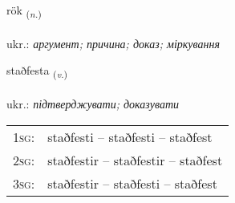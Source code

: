 \documentclass[frontgrid, backgrid]{flacards}\usepackage[]{graphicx}\usepackage[]{xcolor}
\begin{document}
\renewcommand{\flhead}{\vskip5pt \fboxsep=0pt {\small\bfseries\footnotesize Nafnorð | іменник}}
\renewcommand{\fcfoot}{\vskip5pt \fboxsep=0pt \hspace{2pt}{\small\bfseries\footnotesize 1K}}

\renewcommand{\blhead}{\vskip5pt {\small\bfseries\footnotesize Nafnorð | іменник }}
\renewcommand{\bcfoot}{\vskip5pt \hspace{2pt}{\small\bfseries\footnotesize 1K}}


{rök \small{\textsubscript{(\textit{n.})}} \\[1ex] %
\textphonetic{[rœːk]} \\
ukr.: \emph{аргумент; причина; доказ; міркування} \\  [2ex]
\renewcommand*{\arraystretch}{0.8}
}

\renewcommand{\flhead}{\vskip5pt \fboxsep=0pt {\small\bfseries\footnotesize Sagnorð | дієслово}}
\renewcommand{\fcfoot}{\vskip5pt \fboxsep=0pt \hspace{2pt}{\small\bfseries\footnotesize 1K}}

\renewcommand{\blhead}{\vskip5pt {\small\bfseries\footnotesize Sagnorð | дієслово }}
\renewcommand{\bcfoot}{\vskip5pt \hspace{2pt}{\small\bfseries\footnotesize 1K}}


{staðfesta \small{\textsubscript{(\textit{v.})}} \\[1ex] %
\textphonetic{[staðfɛsta]} \\
ukr.: \emph{підтверджувати; доказувати} \\  [2ex]
\renewcommand*{\arraystretch}{0.8}
\begin{tabular}{p{1cm}l}
\textsc{1sg}: & staðfesti -- staðfesti -- staðfest \\ 
\textsc{2sg}: & staðfestir -- staðfestir -- staðfest \\ 
\textsc{3sg}: & staðfestir -- staðfesti -- staðfest \\ 
\end{tabular}
}
\end{document}
